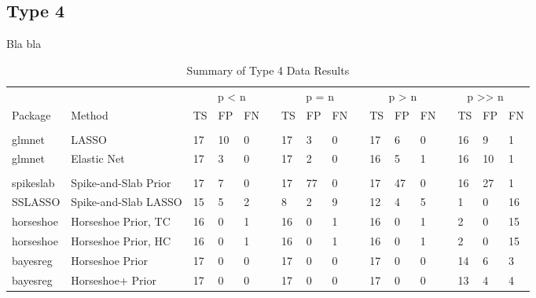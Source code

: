 \documentclass[
  11pt,
]{article}
\begin{document}
\subsection{Type 4}

Bla bla

\begin{table}[!h]

\caption{\label{tab:Results T4}Summary of Type 4 Data Results}
\centering
\fontsize{8.5}{10.5}\selectfont
\begin{tabular}[t]{>{}l|>{}l|>{}l|>{}l|>{}l|>{}l|>{}l|>{}l|>{}l|>{}l|>{}l|>{}l|>{}l|>{}l|>{}l|>{}l|>{}l|}
\toprule
\multicolumn{2}{c}{ } & \multicolumn{4}{c}{p < n} & \multicolumn{4}{c}{p = n} & \multicolumn{3}{c}{p > n} & \multicolumn{4}{c}{p >> n} \\
\cmidrule(l{3pt}r{3pt}){3-6} \cmidrule(l{3pt}r{3pt}){7-10} \cmidrule(l{3pt}r{3pt}){11-13} \cmidrule(l{3pt}r{3pt}){14-17}
Package & Method & TS & FP & FN &  & TS & FP & FN &  & TS & FP & FN &  & TS & FP & FN\\
\midrule
\addlinespace[0.3em]
\multicolumn{17}{l}{\textbf{Frequentist Methods}}\\
\hspace{1em}glmnet & LASSO & 17 & 10 & 0 &  & 17 & 3 & 0 &  & 17 & 6 & 0 &  & 16 & 9 & 1\\
\hspace{1em}glmnet & Elastic Net & 17 & 3 & 0 &  & 17 & 2 & 0 &  & 16 & 5 & 1 &  & 16 & 10 & 1\\
\addlinespace[0.3em]
\multicolumn{17}{l}{\textbf{Bayesian Methods}}\\
\hspace{1em}spikeslab & Spike-and-Slab Prior & 17 & 7 & 0 &  & 17 & 77 & 0 &  & 17 & 47 & 0 &  & 16 & 27 & 1\\
\hspace{1em}SSLASSO & Spike-and-Slab LASSO & 15 & 5 & 2 &  & 8 & 2 & 9 &  & 12 & 4 & 5 &  & 1 & 0 & 16\\
\hspace{1em}horseshoe & Horseshoe Prior, TC & 16 & 0 & 1 &  & 16 & 0 & 1 &  & 16 & 0 & 1 &  & 2 & 0 & 15\\
\hspace{1em}horseshoe & Horseshoe Prior, HC & 16 & 0 & 1 &  & 16 & 0 & 1 &  & 16 & 0 & 1 &  & 2 & 0 & 15\\
\hspace{1em}bayesreg & Horseshoe Prior & 17 & 0 & 0 &  & 17 & 0 & 0 &  & 17 & 0 & 0 &  & 14 & 6 & 3\\
\hspace{1em}bayesreg & Horseshoe+ Prior & 17 & 0 & 0 &  & 17 & 0 & 0 &  & 17 & 0 & 0 &  & 13 & 4 & 4\\

\end{tabular}
\end{table}
\end{document}
